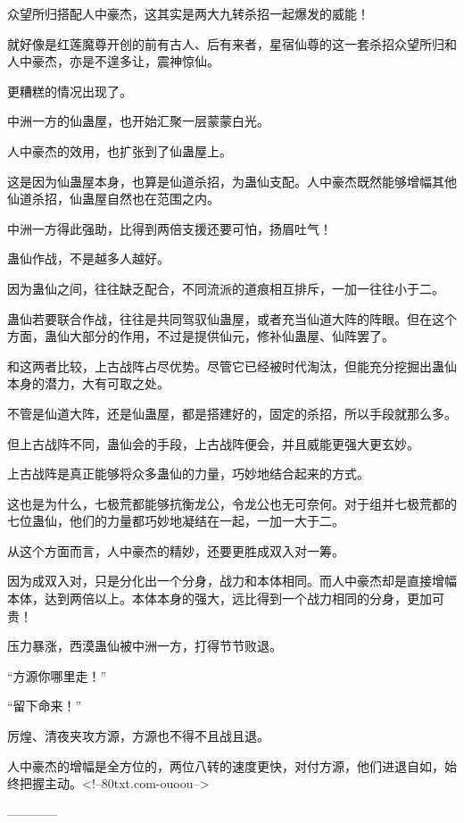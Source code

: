 \begin{this_body}
众望所归搭配人中豪杰，这其实是两大九转杀招一起爆发的威能！

就好像是红莲魔尊开创的前有古人、后有来者，星宿仙尊的这一套杀招众望所归和人中豪杰，亦是不遑多让，震神惊仙。

更糟糕的情况出现了。

中洲一方的仙蛊屋，也开始汇聚一层蒙蒙白光。

人中豪杰的效用，也扩张到了仙蛊屋上。

这是因为仙蛊屋本身，也算是仙道杀招，为蛊仙支配。人中豪杰既然能够增幅其他仙道杀招，仙蛊屋自然也在范围之内。

中洲一方得此强助，比得到两倍支援还要可怕，扬眉吐气！

蛊仙作战，不是越多人越好。

因为蛊仙之间，往往缺乏配合，不同流派的道痕相互排斥，一加一往往小于二。

蛊仙若要联合作战，往往是共同驾驭仙蛊屋，或者充当仙道大阵的阵眼。但在这个方面，蛊仙大部分的作用，不过是提供仙元，修补仙蛊屋、仙阵罢了。

和这两者比较，上古战阵占尽优势。尽管它已经被时代淘汰，但能充分挖掘出蛊仙本身的潜力，大有可取之处。

不管是仙道大阵，还是仙蛊屋，都是搭建好的，固定的杀招，所以手段就那么多。

但上古战阵不同，蛊仙会的手段，上古战阵便会，并且威能更强大更玄妙。

上古战阵是真正能够将众多蛊仙的力量，巧妙地结合起来的方式。

这也是为什么，七极荒都能够抗衡龙公，令龙公也无可奈何。对于组并七极荒都的七位蛊仙，他们的力量都巧妙地凝结在一起，一加一大于二。

从这个方面而言，人中豪杰的精妙，还要更胜成双入对一筹。

因为成双入对，只是分化出一个分身，战力和本体相同。而人中豪杰却是直接增幅本体，达到两倍以上。本体本身的强大，远比得到一个战力相同的分身，更加可贵！

压力暴涨，西漠蛊仙被中洲一方，打得节节败退。

“方源你哪里走！”

“留下命来！”

厉煌、清夜夹攻方源，方源也不得不且战且退。

人中豪杰的增幅是全方位的，两位八转的速度更快，对付方源，他们进退自如，始终把握主动。<!--80txt.com-ouoou-->

------------

\end{this_body}

